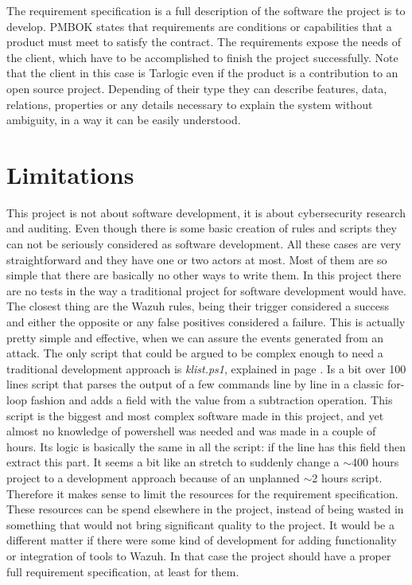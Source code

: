
The requirement specification is a full description of the software the project is to develop.
PMBOK\cite{pmbok} states that requirements are conditions or capabilities that a product must meet to satisfy the contract.
The requirements expose the needs of the client, which have to be accomplished to finish the project successfully.
Note that the client in this case is Tarlogic even if the product is a contribution to an open source project.
\linej
Depending of their type they can describe features, data, relations, properties or any details necessary to explain the system without ambiguity, in a way it can be easily understood.

\section{Limitations} \label{design_no_need}
This project is not about software development, it is about cybersecurity research and auditing.
\linej
Even though there is some basic creation of rules and scripts they can not be seriously considered as software development.
All these cases are very straightforward and they have one or two actors at most.
Most of them are so simple that there are basically no other ways to write them.
\linej
\linej
In this project there are no tests in the way a traditional project for software development would have.
The closest thing are the Wazuh rules, being their trigger considered a success and either the opposite or any false positives considered a failure.
This is actually pretty simple and effective, when we can assure the events generated from an attack.
\linej
\linej
The only script that could be argued to be complex enough to need a traditional development approach is \textit{klist.ps1}\cite{memoria_github}, explained in page \pageref{klist_detection}. Is a bit over 100 lines script that parses the output of a few commands line by line in a classic for-loop fashion and adds a field with the value from a subtraction operation.
\linej
This script is the biggest and most complex software made in this project, and yet almost no knowledge of powershell was needed and was made in a couple of hours.
Its logic is basically the same in all the script: if the line has this field then extract this part.
\linej
It seems a bit like an stretch to suddenly change a $\sim$400 hours project to a development approach because of an unplanned $\sim$2 hours script.
\linej
\linej
Therefore it makes sense to limit the resources for the requirement specification. These resources can be spend elsewhere in the project, instead of being wasted in something that would not bring significant quality to the project.
\linej
It would be a different matter if there were some kind of development for adding functionality or integration of tools to Wazuh. In that case the project should have a proper full requirement specification, at least for them.

